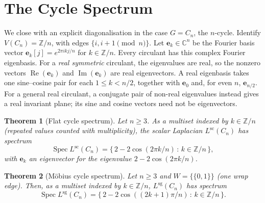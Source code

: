 \documentclass[11pt,a4paper]{amsart}
\theoremstyle{plain}
\newtheorem{theorem}{Theorem}[section]
\theoremstyle{definition}
\theoremstyle{remark}
\newcommand{\ZZ}{\mathbb{Z}}
\newcommand{\CC}{\mathbb{C}}
\newcommand{\Lscalar}{L^{\operatorname{sc}}}
\newcommand{\Lsigned}{L^{\operatorname{sg}}}
\begin{document}
\section{The Cycle Spectrum}\label{sec:cycles}

We close with an explicit diagonalisation in the case $G=C_n$, the
$n$-cycle. Identify $V(C_n)=\ZZ/n$, with edges $\{i,i+1\pmod n\}$.
Let $\mathbf{e}_k\in \CC^n$ be the Fourier basis vector
$\mathbf{e}_k[j]= e^{2\pi i k j/n}$ for $k\in\ZZ/n$. Every circulant
has this complex Fourier eigenbasis. For a \emph{real symmetric}
circulant, the eigenvalues are real, so the nonzero vectors
$\operatorname{Re}(\mathbf{e}_k)$ and $\operatorname{Im}(\mathbf{e}_k)$
are real eigenvectors. A real eigenbasis takes one sine--cosine pair
for each $1\le k<n/2$, together with $\mathbf{e}_0$ and, for even $n$,
$\mathbf{e}_{n/2}$. For a general real circulant, a conjugate pair of
non-real eigenvalues instead gives a real invariant plane; its sine
and cosine vectors need not be eigenvectors.

\begin{theorem}[Flat cycle spectrum]\label{thm:flat-cycle}
Let $n\ge 3$. As a multiset indexed by $k\in\ZZ/n$ (repeated values
counted with multiplicity), the scalar Laplacian $\Lscalar(C_n)$ has
spectrum
\[
  \operatorname{Spec}\Lscalar(C_n)
  = \bigl\{\, 2 - 2\cos(2\pi k/n) \,:\, k\in\ZZ/n\,\bigr\},
\]
with $\mathbf{e}_k$ an eigenvector for the eigenvalue
$2-2\cos(2\pi k/n)$.
\end{theorem}

\begin{theorem}[Möbius cycle spectrum]\label{thm:mobius-cycle}
Let $n\ge 3$ and $W=\{\{0,1\}\}$ (one wrap edge). Then, as a multiset
indexed by $k\in\ZZ/n$, $\Lsigned(C_n)$ has spectrum
\[
  \operatorname{Spec}\Lsigned(C_n)
  = \bigl\{\, 2 - 2\cos((2k+1)\pi/n) \,:\, k\in\ZZ/n\,\bigr\}.
\]
\end{theorem}
\end{document}
